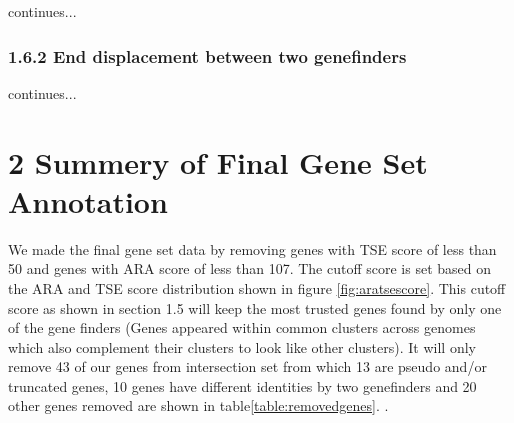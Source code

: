 \documentclass[table,
12pt, %
a4paper, %
oneside, %
headinclude,footinclude, %
BCOR5mm, %
]{scrartcl}
\begin{document}
\begin{table}[htbp]
\begin{adjustbox}{width=\textwidth,center}
\begin{tabular}{|lcclccccc|}
      \hline
    \end{tabular}
    \label{table:undet2}
  \end{adjustbox}
\end{table}

continues...\\


\subsubsection{1.6.2 End displacement between two genefinders}
continues...\\

\section{2 Summery of Final Gene Set Annotation}
We made the final gene set data by removing genes with TSE score of less than 50 and genes with ARA score of less than 107. The cutoff score is set based on the ARA and TSE score distribution shown in figure \ref{fig:aratsescore}. This cutoff score as shown in section 1.5 will keep the most trusted genes found by only one of the gene finders (Genes appeared within common clusters across genomes which also complement their clusters to look like other clusters). It will only remove 43 of our genes from intersection set from which 13 are pseudo and/or truncated genes, 10 genes have different identities by two genefinders and 20 other genes removed are shown in table\ref{table:removedgenes}.
. %
\end{document}
